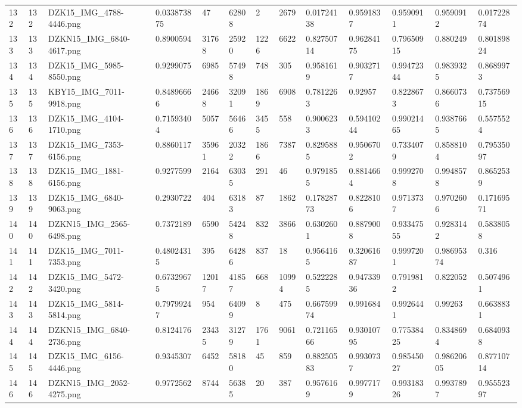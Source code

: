 \documentclass[11pt, a4paper, twoside]{report}
\begin{document}
\begin{longtable}[c]{@{}lllllllllllll@{}}
132 & 132 & DZK15\_IMG\_4788-4446.png & 0.033873875 & 47 & 62808 & 2 & 2679 & 0.01724138 & 0.9591837 & 0.9590911 & 0.9590912 & 0.01722874 \\
133 & 133 & DZKN15\_IMG\_6840-4617.png & 0.8900594 & 31768 & 25920 & 1226 & 6622 & 0.82750714 & 0.96284175 & 0.79650915 & 0.880249 & 0.80189824 \\
134 & 134 & DZK15\_IMG\_5985-8550.png & 0.9299075 & 6985 & 57498 & 748 & 305 & 0.9581619 & 0.9032717 & 0.99472344 & 0.9839325 & 0.8689973 \\
135 & 135 & KBY15\_IMG\_7011-9918.png & 0.84896666 & 24668 & 32091 & 1869 & 6908 & 0.7812263 & 0.92957 & 0.8228673 & 0.8660736 & 0.73756915 \\
136 & 136 & DZK15\_IMG\_4104-1710.png & 0.71593404 & 5057 & 56466 & 3455 & 558 & 0.9006233 & 0.59410244 & 0.99021465 & 0.9387665 & 0.5575524 \\
137 & 137 & DZK15\_IMG\_7353-6156.png & 0.8860117 & 35961 & 20322 & 1866 & 7387 & 0.8295885 & 0.9506702 & 0.7334079 & 0.8588104 & 0.79535097 \\
138 & 138 & DZK15\_IMG\_1881-6156.png & 0.9277599 & 2164 & 63035 & 291 & 46 & 0.9791855 & 0.8814664 & 0.9992708 & 0.9948578 & 0.8652539 \\
139 & 139 & DZK15\_IMG\_6840-9063.png & 0.2930722 & 404 & 63183 & 87 & 1862 & 0.17828773 & 0.8228106 & 0.9713737 & 0.9702606 & 0.17169571 \\
140 & 140 & DZKN15\_IMG\_2565-6498.png & 0.7372189 & 6590 & 54248 & 832 & 3866 & 0.6302601 & 0.8879008 & 0.93347555 & 0.9283142 & 0.5838058 \\
141 & 141 & DZK15\_IMG\_7011-7353.png & 0.48024315 & 395 & 64286 & 837 & 18 & 0.9564165 & 0.32061687 & 0.9997201 & 0.98695374 & 0.316 \\
142 & 142 & DZK15\_IMG\_5472-3420.png & 0.67329675 & 12017 & 41857 & 668 & 10994 & 0.5222285 & 0.94733936 & 0.7919812 & 0.822052 & 0.5074961 \\
143 & 143 & DZK15\_IMG\_5814-5814.png & 0.79799247 & 954 & 64099 & 8 & 475 & 0.66759974 & 0.991684 & 0.9926441 & 0.99263 & 0.6638831 \\
144 & 144 & DZKN15\_IMG\_6840-2736.png & 0.8124176 & 23435 & 31279 & 1761 & 9061 & 0.72116566 & 0.93010795 & 0.77538425 & 0.8348694 & 0.6840938 \\
145 & 145 & DZK15\_IMG\_6156-4446.png & 0.9345307 & 6452 & 58180 & 45 & 859 & 0.88250583 & 0.9930737 & 0.98545027 & 0.98620605 & 0.87710714 \\
146 & 146 & DZKN15\_IMG\_2052-4275.png & 0.9772562 & 8744 & 56385 & 20 & 387 & 0.9576169 & 0.9977179 & 0.99318326 & 0.9937897 & 0.95552397 \\

\end{longtable}
\end{document}
